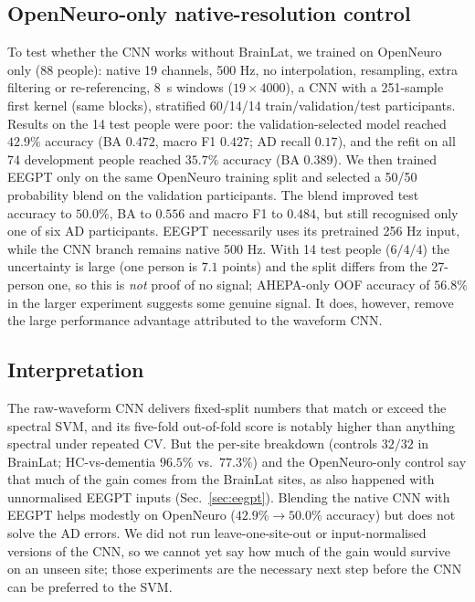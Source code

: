 \documentclass[10pt,twocolumn,a4paper]{article}
\begin{document}
\subsection{OpenNeuro-only native-resolution control}
\label{sec:cnnopenneuro}
To test whether the CNN works without BrainLat, we trained on OpenNeuro only (88 people): native 19 channels, 500 Hz, no interpolation, resampling, extra filtering or re-referencing, 8~s windows ($19{\times}4000$), a CNN with a 251-sample first kernel (same blocks), stratified 60/14/14 train/validation/test participants. Results on the 14 test people were poor: the validation-selected model reached $42.9\%$ accuracy (BA $0.472$, macro F1 $0.427$; AD recall $0.17$), and the refit on all 74 development people reached $35.7\%$ accuracy (BA $0.389$). We then trained EEGPT only on the same OpenNeuro training split and selected a 50/50 probability blend on the validation participants. The blend improved test accuracy to $50.0\%$, BA to $0.556$ and macro F1 to $0.484$, but still recognised only one of six AD participants. EEGPT necessarily uses its pretrained 256 Hz input, while the CNN branch remains native 500 Hz. With 14 test people ($6/4/4$) the uncertainty is large (one person is $7.1$ points) and the split differs from the 27-person one, so this is \emph{not} proof of no signal; AHEPA-only OOF accuracy of $56.8\%$ in the larger experiment suggests some genuine signal. It does, however, remove the large performance advantage attributed to the waveform CNN.

\subsection{Interpretation}
The raw-waveform CNN delivers fixed-split numbers that match or exceed the spectral SVM, and its five-fold out-of-fold score is notably higher than anything spectral under repeated CV. But the per-site breakdown (controls $32/32$ in BrainLat; HC-vs-dementia $96.5\%$ vs.\ $77.3\%$) and the OpenNeuro-only control say that much of the gain comes from the BrainLat sites, as also happened with unnormalised EEGPT inputs (Sec.~\ref{sec:eegpt}). Blending the native CNN with EEGPT helps modestly on OpenNeuro ($42.9\%\to50.0\%$ accuracy) but does not solve the AD errors. We did not run leave-one-site-out or input-normalised versions of the CNN, so we cannot yet say how much of the gain would survive on an unseen site; those experiments are the necessary next step before the CNN can be preferred to the SVM.
\FloatBarrier
\flushbottom
\end{document}
